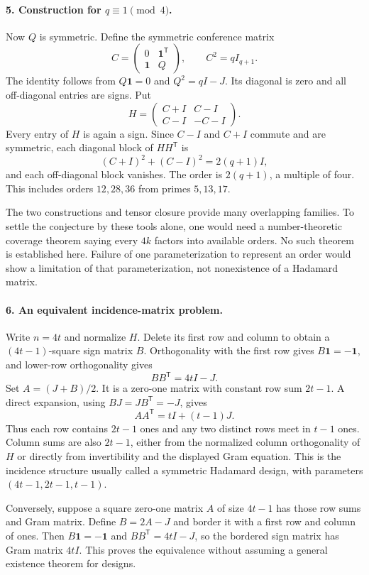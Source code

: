 \documentclass[11pt]{article}
\begin{document}
\paragraph{5. Construction for $q\equiv1\pmod4$.}
Now $Q$ is symmetric. Define the symmetric conference matrix
\[
 C=\begin{pmatrix}0&\mathbf1^{\mathsf T}\\
 \mathbf1&Q\end{pmatrix},\qquad C^2=qI_{q+1}.
\]
The identity follows from $Q\mathbf1=0$ and $Q^2=qI-J$. Its diagonal is zero and all off-diagonal entries are signs. Put
\[
 H=\begin{pmatrix}C+I&C-I\\ C-I&-C-I\end{pmatrix}.
\]
Every entry of $H$ is again a sign. Since $C-I$ and $C+I$ commute and are symmetric, each diagonal block of $HH^{\mathsf T}$ is
\[
 (C+I)^2+(C-I)^2=2(q+1)I,
\]
and each off-diagonal block vanishes. The order is $2(q+1)$, a multiple of four. This includes orders $12,28,36$ from primes $5,13,17$.

The two constructions and tensor closure provide many overlapping families. To settle the conjecture by these tools alone, one would need a number-theoretic coverage theorem saying every $4k$ factors into available orders. No such theorem is established here. Failure of one parameterization to represent an order would show a limitation of that parameterization, not nonexistence of a Hadamard matrix.

\paragraph{6. An equivalent incidence-matrix problem.}
Write $n=4t$ and normalize $H$. Delete its first row and column to obtain a $(4t-1)$-square sign matrix $B$. Orthogonality with the first row gives $B\mathbf1=-\mathbf1$, and lower-row orthogonality gives
\[
 BB^{\mathsf T}=4tI-J.
\]
Set $A=(J+B)/2$. It is a zero-one matrix with constant row sum $2t-1$. A direct expansion, using $BJ=JB^{\mathsf T}=-J$, gives
\[
 AA^{\mathsf T}=tI+(t-1)J.
\]
Thus each row contains $2t-1$ ones and any two distinct rows meet in $t-1$ ones. Column sums are also $2t-1$, either from the normalized column orthogonality of $H$ or directly from invertibility and the displayed Gram equation. This is the incidence structure usually called a symmetric Hadamard design, with parameters $(4t-1,2t-1,t-1)$.

Conversely, suppose a square zero-one matrix $A$ of size $4t-1$ has those row sums and Gram matrix. Define $B=2A-J$ and border it with a first row and column of ones. Then $B\mathbf1=-\mathbf1$ and $BB^{\mathsf T}=4tI-J$, so the bordered sign matrix has Gram matrix $4tI$. This proves the equivalence without assuming a general existence theorem for designs.
\end{document}
